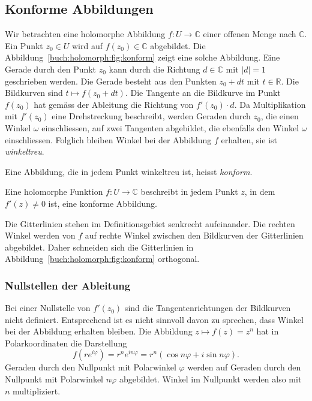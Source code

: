 %
%
%
\subsection{Konforme Abbildungen}
%
Wir betrachten eine holomorphe Abbildung $f\colon U\to\mathbb{C}$ einer
offenen Menge nach $\mathbb{C}$.
Ein Punkt $z_0 \in U$ wird auf $f(z_0)\in\mathbb{C}$ abgebildet.
Die Abbildung~\ref{buch:holomorph:fig:konform} zeigt eine solche Abbildung.
Eine Gerade durch den Punkt $z_0$ kann durch die Richtung $d\in\mathbb{C}$
mit $|d|=1$ geschrieben werden.
Die Gerade besteht aus den Punkten $z_0+dt$ mit $t\in\mathbb{R}$.
Die Bildkurven sind $t\mapsto f(z_0+dt)$.
Die Tangente an die Bildkurve im Punkt $f(z_0)$ hat gemäss der
Ableitung  die Richtung von
\(
f'(z_0) \cdot d.
\)
Da Multiplikation mit $f'(z_0)$ eine Drehstreckung beschreibt, werden
Geraden durch $z_0$, die einen Winkel $\omega$ einschliessen, auf zwei
Tangenten abgebildet, die ebenfalls den Winkel $\omega$ einschliessen.
Folglich bleiben Winkel bei der Abbildung $f$ erhalten, sie ist
\emph{winkeltreu}.
%

\begin{definition}
Eine Abbildung, die in jedem Punkt winkeltreu ist,
heisst \emph{konform}.
%
\end{definition}

\begin{satz}
Eine holomorphe Funktion $f\colon U\to\mathbb{C}$ beschreibt in jedem
Punkt $z$, in dem $f'(z)\ne 0$ ist, eine konforme Abbildung.
\end{satz}

Die Gitterlinien stehen im Definitionsgebiet senkrecht aufeinander.
Die rechten Winkel werden von $f$ auf rechte Winkel zwischen den
Bildkurven der Gitterlinien abgebildet.
Daher schneiden sich die Gitterlinien in
Abbildung~\ref{buch:holomorph:fig:konform}
orthogonal.

%
%
\subsubsection{Nullstellen der Ableitung}
Bei einer Nullstelle von $f'(z_0)$ sind die Tangentenrichtungen der 
Bildkurven nicht definiert.
Entsprechend ist es nicht sinnvoll davon zu sprechen, dass Winkel bei
der Abbildung erhalten bleiben.
Die Abbildung $z\mapsto f(z) = z^n$ hat in Polarkoordinaten die
Darstellung 
\[
f(re^{i\varphi})
=
r^n e^{in\varphi}
=
r^n(\cos n\varphi + i\sin n\varphi).
\]
Geraden durch den Nullpunkt mit Polarwinkel $\varphi$ werden auf
Geraden durch den Nullpunkt mit Polarwinkel $n\varphi$ abgebildet.
Winkel im Nullpunkt werden also mit $n$ multipliziert.

